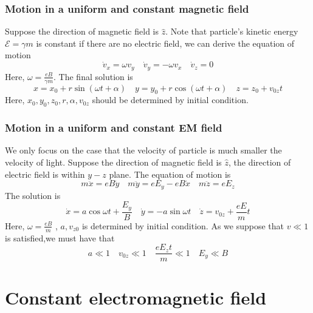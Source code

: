 \documentclass[cyan]{elegantnote}
\begin{document}
\subsubsection{Motion in a uniform and constant magnetic field}
Suppose the direction of magnetic field is $\hat{z}$. Note that particle's kinetic energy $\mathcal{E} = \gamma m$ is constant if there are no electric field, we can derive the equation of motion
\[\dot{v}_x = \omega v_y \quad \dot{v}_y = -\omega v_x \quad \dot{v}_z = 0\]
Here, $\omega = \frac{eB}{\gamma m}$. The final solution is
\[x = x_0 + r\sin(\omega t + \alpha) \quad y = y_0 + r\cos(\omega t + \alpha) \quad z = z_0 + v_{0z}t\]
Here, $x_0,y_0,z_0,r,\alpha,v_{0z}$ should be determined by initial condition.
\subsubsection{Motion in a uniform and constant EM field}
We only focus on the case that the velocity of particle is much smaller the velocity of light. Suppose the direction of magnetic field is $\hat{z}$, the direction of electric field is within $y-z$ plane. The equation of motion is
\[m\ddot{x} = eB\dot{y} \quad m\ddot{y} =eE_y - eB\dot{x} \quad m\ddot{z}=eE_z\]
The solution is
\[\dot{x} = a \cos \omega t + \frac{E_y}{B} \quad \dot{y} = -a\sin \omega t \quad \dot{z} = v_{0z} + \frac{eE}{m}t\]
Here, $\omega = \frac{eB}{m}$ , $a,v_{z0}$ is determined by initial condition. As we suppose that $v \ll 1$ is satisfied,we must have that
\[a \ll 1 \quad v_{0z} \ll 1 \quad \frac{eE_z t}{m} \ll 1 \quad E_y \ll B\]

\section{Constant electromagnetic field}
\end{document}
